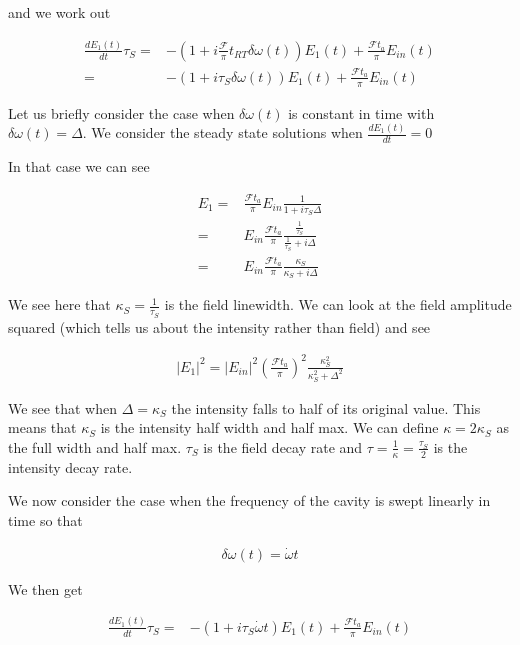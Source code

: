 \documentclass[12pt]{article}
\begin{document}
and we work out

\begin{align}
\frac{dE_1(t)}{dt} \tau_S =&-\left(1 + i \frac{\mathcal{F}}{\pi} t_{RT} \delta\omega(t)\right)E_1(t) + \frac{\mathcal{F}t_a}{\pi}E_{in}(t)\\
=& -(1 + i \tau_S \delta \omega(t))E_1(t) + \frac{\mathcal{F}t_a}{\pi}E_{in}(t)
\end{align}

Let us briefly consider the case when $\delta \omega(t)$ is constant in time with $\delta \omega(t) = \Delta$.
We consider the steady state solutions when $\frac{dE_1(t)}{dt}=0$

In that case we can see

\begin{align}
E_1 =& \frac{\mathcal{F}t_a}{\pi}E_{in} \frac{1}{1+i\tau_S\Delta}\\
=& E_{in}\frac{\mathcal{F}t_a}{\pi} \frac{\frac{1}{\tau_S}}{\frac{1}{\tau_S} + i\Delta}\\
=& E_{in}\frac{\mathcal{F}t_a}{\pi} \frac{\kappa_S}{\kappa_S+i\Delta}
\end{align}

We see here that $\kappa_S=\frac{1}{\tau_S}$ is the field linewidth.
We can look at the field amplitude squared (which tells us about the intensity rather than field) and see

\begin{align}
|E_1|^2 = |E_{in}|^2 \left(\frac{\mathcal{F}t_a}{\pi}\right)^2 \frac{\kappa_S^2}{\kappa_S^2 + \Delta^2}
\end{align}

We see that when $\Delta = \kappa_S$ the intensity falls to half of its original value.
This means that $\kappa_S$ is the intensity half width and half max. 
We can define $\kappa = 2\kappa_S$ as the full width and half max.
$\tau_S$ is the field decay rate and $\tau = \frac{1}{\kappa} = \frac{\tau_S}{2}$ is the intensity decay rate.

We now consider the case when the frequency of the cavity is swept linearly in time so that

\begin{align}
\delta \omega(t) = \dot{\omega} t
\end{align}

We then get

\begin{align}
\frac{dE_1(t)}{dt} \tau_S =& -(1+i\tau_S \dot{\omega} t)E_1(t) + \frac{\mathcal{F}t_a}{\pi}E_{in}(t)
\end{align}
\end{document}
